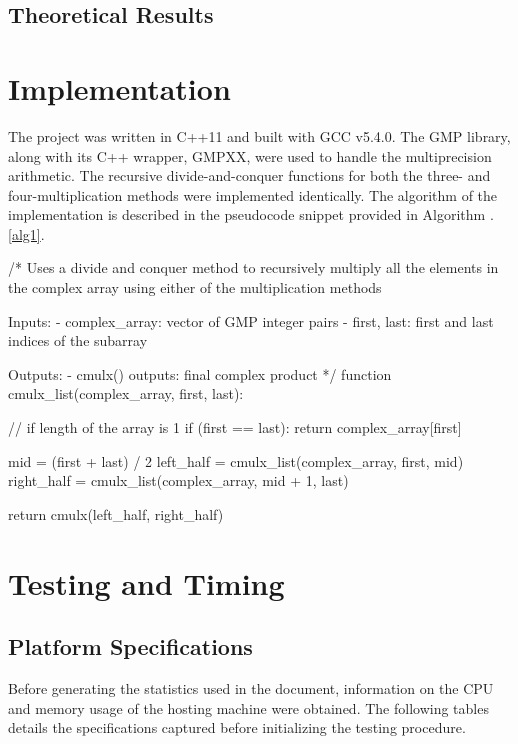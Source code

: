\documentclass[usletter, 12pt]{article}
\begin{document}
        \subsection{Theoretical Results}

    \section{Implementation}
    The project was written in C++11 and built with GCC v5.4.0. The GMP library, along with its C++ wrapper, GMPXX, were used to handle the multiprecision arithmetic. The recursive divide-and-conquer functions for both the three- and four-multiplication methods were implemented identically. The algorithm of the implementation is described in the pseudocode snippet provided in Algorithm \thesection.\ref{alg1}.

\begin{pseudocode}[caption={Divide and Conquer Multiplication}, label={alg1}]
/*
Uses a divide and conquer method to recursively multiply all the elements in
the complex array using either of the multiplication methods

Inputs:
    - complex_array: vector of GMP integer pairs
    - first, last: first and last indices of the subarray

Outputs:
    - cmulx() outputs: final complex product
*/
function cmulx_list(complex_array, first, last):

    // if length of the array is 1
    if (first == last):
        return complex_array[first]

    mid = (first + last) / 2
    left_half = cmulx_list(complex_array, first, mid)
    right_half = cmulx_list(complex_array, mid + 1, last)

    return cmulx(left_half, right_half)

\end{pseudocode}

    \section{Testing and Timing}

        \subsection{Platform Specifications}
        Before generating the statistics used in the document, information on the CPU and memory usage of the hosting machine were obtained. The following tables details the specifications captured before initializing the testing procedure.
\end{document}
